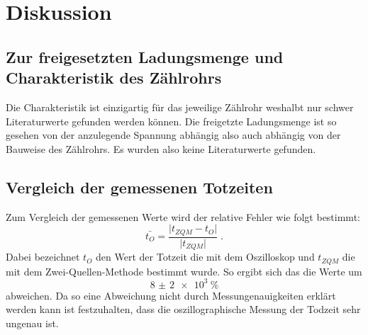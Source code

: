 \section{Diskussion}
\label{sec:Diskussion}
\subsection{Zur freigesetzten Ladungsmenge und Charakteristik des Zählrohrs}
Die Charakteristik ist einzigartig für das jeweilige Zählrohr weshalbt nur
schwer Literaturwerte gefunden werden können.
Die freigetzte Ladungsmenge ist so gesehen von der anzulegende Spannung
abhängig also auch abhängig von der Bauweise des Zählrohrs. Es wurden also
keine Literaturwerte gefunden.

\subsection{Vergleich der gemessenen Totzeiten}
Zum Vergleich der gemessenen Werte wird der relative Fehler wie folgt bestimmt:
\begin{equation*}
  \bar{t_O} = \frac{\lvert t_{ZQM} - t_O \rvert}{\lvert t_{ZQM} \rvert}\;.
\end{equation*}
Dabei bezeichnet $t_O$ den Wert der Totzeit die mit dem Oszilloskop und
$t_{ZQM}$ die mit dem Zwei-Quellen-Methode bestimmt wurde.
So ergibt sich das die Werte um
\begin{equation*}
  \SI{8(2)e3}{\percent}
\end{equation*}
abweichen. Da so eine Abweichung nicht durch Messungenauigkeiten erklärt werden
kann ist festzuhalten, dass die oszillographische Messung der Todzeit sehr
ungenau ist.
